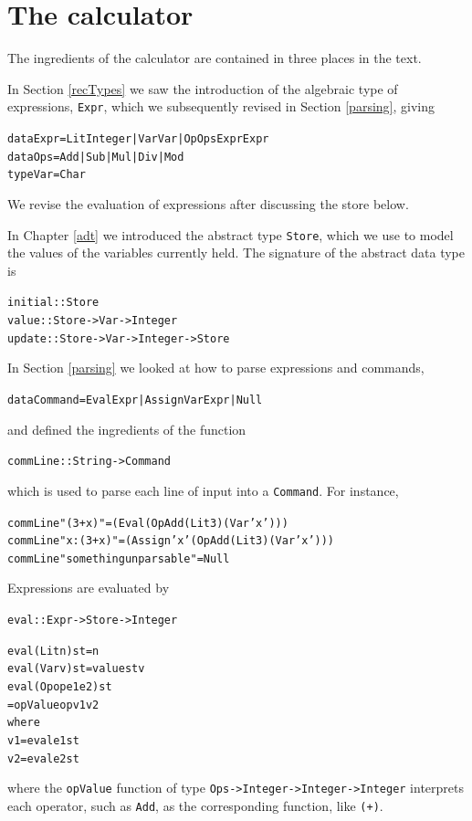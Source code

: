\section{The calculator}
\label{interactiveCalc}

The ingredients of the calculator are contained in three places in the text.
\begin{titemize}
\item In Section \ref{recTypes} we saw the introduction of the algebraic type of
expressions, \texttt{Expr}, which we subsequently revised in Section
\ref{parsing}, giving
\begin{alltt}
data Expr = Lit Integer | Var Var | Op Ops Expr Expr
data Ops  = Add | Sub | Mul | Div | Mod
type Var  = Char
\end{alltt}
We revise the evaluation of expressions after discussing the store below. 
\item In Chapter \ref{adt} we introduced the abstract type
\texttt{Store}, which we use to model the values of the variables
currently held. The signature of the abstract data type is
\begin{alltt}
initial :: Store 
value   :: Store -> Var -> Integer
update  :: Store -> Var -> Integer -> Store
\end{alltt}
\item In Section \ref{parsing} we looked at how to parse expressions and
commands, 
\begin{alltt}
data Command = Eval Expr | Assign Var Expr | Null
\end{alltt}
and defined the ingredients of the function
\begin{alltt}
commLine :: String -> Command
\end{alltt}
which is used to parse each line of input into a \texttt{Command}. For instance,
\begin{alltt}
commLine "(3+x)"   = (Eval (Op Add (Lit 3) (Var 'x')))
commLine "x:(3+x)" = (Assign 'x' (Op Add (Lit 3) (Var 'x')))
commLine "something unparsable" = Null
\end{alltt} 
\end{titemize}
Expressions are evaluated by
\begin{alltt}
eval :: Expr -> Store -> Integer

eval (Lit n) st = n
eval (Var v) st = value st v
eval (Op op e1 e2) st
  = opValue op v1 v2
    where
    v1 = eval e1 st
    v2 = eval e2 st
\end{alltt}
where the \texttt{opValue} function  of type \texttt{Ops->Integer->Integer->Integer}
interprets each operator, such as \texttt{Add}, as the corresponding function,
like \texttt{(+)}. 

